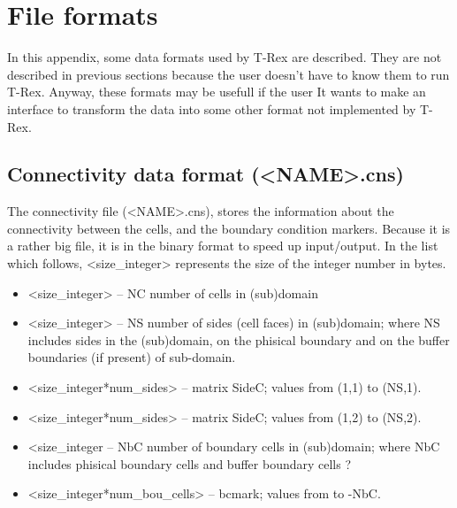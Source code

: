 \documentclass[10pt]{article}
\newcommand*{\tc}{\ttfamily} %
\newcommand*{\tn}{\sffamily} %
\begin{document}
%
    \appendix 
    \newpage
    \section{File formats}
%

    In this appendix, some data formats used by {\tn T-Rex} are
    described. They are not described in previous sections
    because the user doesn't have to know them to run {\tn T-Rex}.
    Anyway, these formats may be usefull if the user It wants to
    make an interface
    to transform the data into some other format not implemented 
    by {\tn T-Rex}.

    \subsection{Connectivity data format ({\tc <NAME>.cns})}

    The connectivity file ({\tc <NAME>.cns}), stores the information
    about the connectivity between the cells, and the boundary
    condition markers. Because it is a rather big file, it is in
    the binary format to speed up input/output. In the list which
    follows, {\tc <size\_integer>} represents the size of the
    integer number in bytes. 
    \begin{itemize}
    \item {\tc <size\_integer>} -- {\tc NC} number of cells in (sub)domain 
    \item {\tc <size\_integer>} -- {\tc NS} number of sides (cell faces)
          in (sub)domain; where {\tc NS} includes sides in the 
          (sub)domain, on the phisical boundary and on the
          buffer boundaries (if present) of sub-domain.  
    \item {\tc <size\_integer*num\_sides>} -- matrix {\tc SideC};
          values from {\tc (1,1)} to {\tc (NS,1)}. 
    \item {\tc <size\_integer*num\_sides>} -- matrix {\tc SideC};
          values from {\tc (1,2)} to {\tc (NS,2)}. 
    \item {\tc <size\_integer} -- {\tc NbC} number 
          of boundary cells in (sub)domain; where NbC includes
          phisical boundary cells and buffer boundary cells ? 
    \item {\tc <size\_integer*num\_bou\_cells>} -- {\tc bcmark};
          values from {\tc -1} to {\tc -NbC}. 
    \end{itemize}
\end{document}
